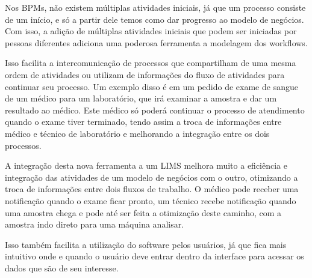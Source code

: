 

Nos BPMs, não existem múltiplas atividades iniciais, já que um processo consiste de um início, e só a partir dele temos como dar progresso ao modelo de negócios. Com isso, a adição de múltiplas atividades iniciais que podem ser iniciadas por pessoas diferentes adiciona uma poderosa ferramenta a modelagem dos workflows.


Isso facilita a intercomunicação de processos que compartilham de uma mesma ordem de atividades ou utilizam de informações do fluxo de atividades para continuar seu processo. Um exemplo disso é em um pedido de exame de sangue de um médico para um laboratório, que irá examinar a amostra e dar um resultado ao médico. Este médico só poderá continuar o processo de atendimento quando o exame tiver terminado, tendo assim a troca de informações entre médico e técnico de laboratório e melhorando a integração entre os dois processos.


A integração desta nova ferramenta a um LIMS melhora muito a eficiência e integração das atividades de um modelo de negócios com o outro, otimizando a troca de informações entre dois fluxos de trabalho. O médico pode receber uma notificação quando o exame ficar pronto, um técnico recebe notificação quando uma amostra chega e pode até ser feita a otimização deste caminho, com a amostra indo direto para uma máquina analisar.

Isso também facilita a utilização do software pelos usuários, já que fica mais intuitivo onde e quando o usuário deve entrar dentro da interface para acessar os dados que são de seu interesse.

